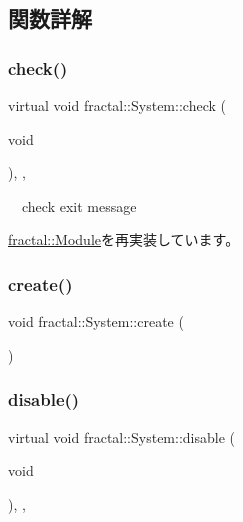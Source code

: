 \subsection{関数詳解}
\mbox{\label{classfractal_1_1System_a95f99e9132a10f87f9179a27c840fa50}} 
\subsubsection{\texorpdfstring{check()}{check()}}
{\footnotesize\ttfamily virtual void fractal\+::\+System\+::check (\begin{DoxyParamCaption}\item[{void}]{ }\end{DoxyParamCaption})\hspace{0.3cm}{\ttfamily [inline]}, {\ttfamily [protected]}, {\ttfamily [virtual]}}



　check exit message 



\hyperlink{classfractal_1_1Module_a245865f346ac1d21b19bce418bf704c4}{fractal\+::\+Module}を再実装しています。

\mbox{\label{classfractal_1_1System_a00d5baae4bcc777c43da65299b464a43}} 
\subsubsection{\texorpdfstring{create()}{create()}}
{\footnotesize\ttfamily void fractal\+::\+System\+::create (\begin{DoxyParamCaption}{ }\end{DoxyParamCaption})\hspace{0.3cm}{\ttfamily [inline]}}

\mbox{\label{classfractal_1_1System_a446532d4c3811f6005e0c52ad653a997}} 
\subsubsection{\texorpdfstring{disable()}{disable()}}
{\footnotesize\ttfamily virtual void fractal\+::\+System\+::disable (\begin{DoxyParamCaption}\item[{void}]{ }\end{DoxyParamCaption})\hspace{0.3cm}{\ttfamily [inline]}, {\ttfamily [private]}, {\ttfamily [virtual]}}



